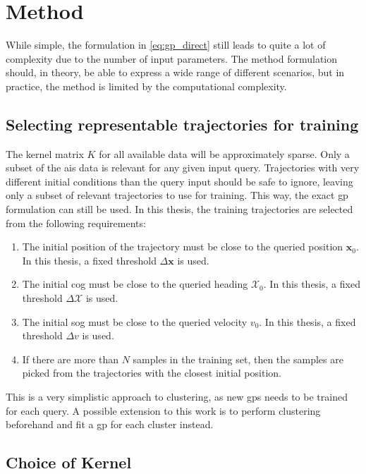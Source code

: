 \section{Method}
While simple, the formulation in \cref{eq:gp_direct} still leads to quite a lot of complexity due to the number of input parameters. The method formulation should, in theory, be able to express a wide range of different scenarios, but in practice, the method is limited by the computational complexity.

\subsection{Selecting representable trajectories for training}
The kernel matrix $K$ for all available data will be approximately sparse. Only a subset of the \acrshort{ais} data is relevant for any given input query. Trajectories with very different initial conditions than the query input should be safe to ignore, leaving only a subset of relevant trajectories to use for training. This way, the exact \acrshort{gp} formulation can still be used.
In this thesis, the training trajectories are selected from the following requirements:
\begin{enumerate}
    \item The initial position of the trajectory must be close to the queried position $\boldsymbol{x}_0$. In this thesis, a fixed threshold $\Delta \boldsymbol{x}$ is used.
    \item The initial \acrshort{cog} must be close to the queried heading $\mathcal{X}_0$. In this thesis, a fixed threshold $\Delta \mathcal{X}$ is used. 
    \item The initial \acrshort{sog} must be close to the queried velocity $v_0$. In this thesis, a fixed threshold $\Delta v$ is used.
    \item If there are more than $N$ samples in the training set, then the samples are picked from the trajectories with the closest initial position. 
\end{enumerate} 

This is a very simplistic approach to clustering, as new \acrshort{gp}s needs to be trained for each query. A possible extension to this work is to perform clustering beforehand and fit a \acrshort{gp} for each cluster instead. 

\subsection{Choice of Kernel}

